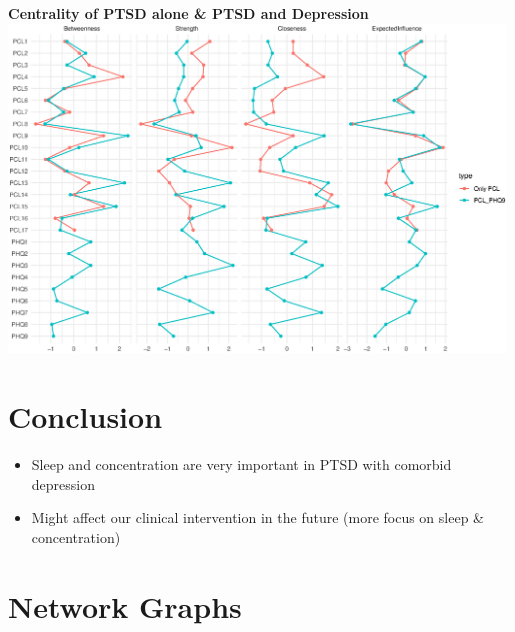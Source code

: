 \documentclass[]{betterposter}
\begin{document}
{\begin{center}
\textbf{Centrality of PTSD alone \& PTSD and Depression}
    \includegraphics[width=0.99\textwidth, height=0.7\textwidth]{img/centralityTotal.eps}
\end{center}

\section{Conclusion}
\begin{itemize}
    \item Sleep and concentration are very important in PTSD with comorbid depression
    \item Might affect our clinical intervention in the future (more focus on sleep \& concentration)
\end{itemize}

\vfill



}{

\section{}
\section{Network Graphs}

}
\end{document}
